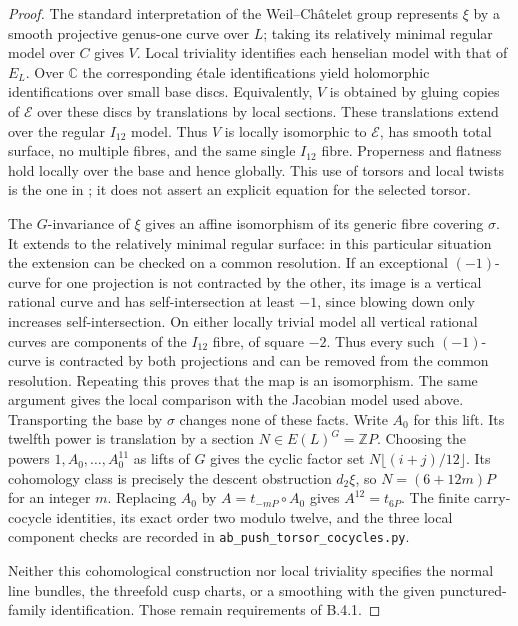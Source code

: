 \begin{proof}
The standard interpretation of the
Weil--Ch\^atelet group represents
$\xi$ by a smooth projective genus-one
curve over $L$; taking its relatively
minimal regular model over $C$ gives
$V$. Local triviality identifies each
henselian model with that of $E_L$.
Over $\mathbb C$ the corresponding
\'etale identifications yield
holomorphic identifications over small
base discs. Equivalently, $V$ is obtained
by gluing copies of $\mathscr E$ over
these discs by translations by local
sections. These translations extend
over the regular $I_{12}$ model.
Thus $V$ is locally isomorphic to
$\mathscr E$, has smooth total surface,
no multiple fibres, and the same single
$I_{12}$ fibre. Properness and flatness
hold locally over the base and hence
globally. This use of torsors and local
twists is the one in
\cite[Sections 3--4]{Xiao91}; it does
not assert an explicit equation for
the selected torsor.

The $G$-invariance of $\xi$ gives an
affine isomorphism of its generic fibre
covering $\sigma$. It extends to the
relatively minimal regular surface:
in this particular situation the
extension can be checked on a common
resolution. If an exceptional
$(-1)$-curve for one projection is not
contracted by the other, its image is
a vertical rational curve and has
self-intersection at least $-1$,
since blowing down only increases
self-intersection. On either locally
trivial model all vertical rational
curves are components of the $I_{12}$
fibre, of square $-2$. Thus every such
$(-1)$-curve is contracted by both
projections and can be removed from
the common resolution. Repeating this
proves that the map is an isomorphism.
The same argument gives the local
comparison with the Jacobian model
used above. Transporting the base by
$\sigma$ changes none of these facts.
Write $A_0$ for this lift. Its twelfth
power is translation by a section
$N\in E(L)^G=\mathbb ZP$.
Choosing the powers $1,A_0,\ldots,A_0^{11}$
as lifts of $G$ gives the cyclic
factor set
$N\lfloor(i+j)/12\rfloor$.
Its cohomology class is precisely the
descent obstruction $d_2\xi$, so
$N=(6+12m)P$ for an integer $m$.
Replacing $A_0$ by $A=t_{-mP}\circ A_0$
gives $A^{12}=t_{6P}$.
The finite carry-cocycle identities,
its exact order two modulo twelve,
and the three local component checks
are recorded in
\texttt{ab\_push\_torsor\_cocycles.py}.

Neither this cohomological construction
nor local triviality specifies the
normal line bundles, the threefold
cusp charts, or a smoothing with the
given punctured-family identification.
Those remain requirements of B.4.1.
\end{proof}

